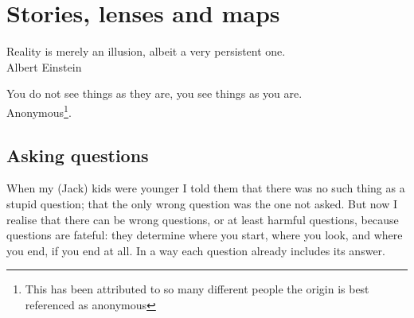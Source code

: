 ﻿%


\chapter{Stories, lenses and maps}
\label{chapter:emergence-einstein-picasso}


\begin{chapterquotation}
Reality is merely an illusion, albeit a very persistent one.\\
\raggedleft\textemdash Albert Einstein


\centering
You do not see things as they are, you see things as you are.\\
\raggedleft\textemdash Anonymous\footnote{This has been attributed to so many different people the origin is best referenced as anonymous}.
\end{chapterquotation}




\section{Asking questions}
\begin{longstoryblock}
When my (Jack) kids were younger I told them that there was no such thing as a stupid question; that the only wrong question was the one not asked. But now I realise that there can be wrong questions, or at least harmful questions, because questions are fateful: they determine where you start, where you look, and where you end, if you end at all. In a way each question already includes its answer. 
\end{longstoryblock}


